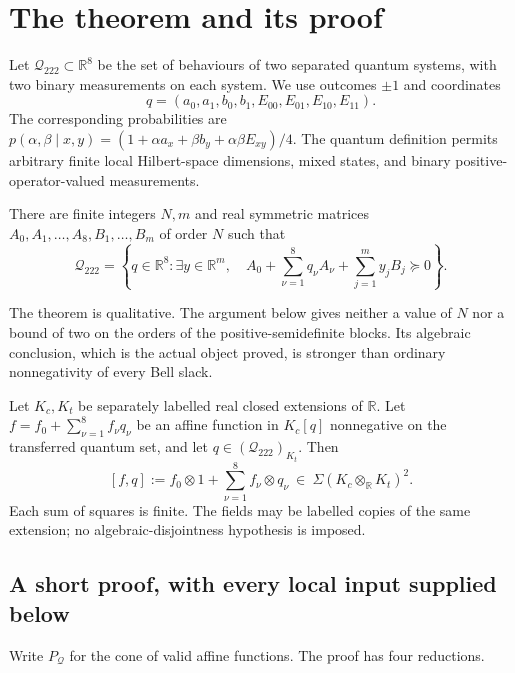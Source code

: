 \chapter{The theorem and its proof}
\label{ch:theorem}

Let $\mathcal Q_{222}\subset\mathbb R^8$ be the set of behaviours of
two separated quantum systems, with two binary measurements on each
system.  We use outcomes $\pm1$ and coordinates
\[
 q=(a_0,a_1,b_0,b_1,E_{00},E_{01},E_{10},E_{11}).
\]
The corresponding probabilities are
$p(\alpha,\beta\mid x,y)=
(1+\alpha a_x+\beta b_y+\alpha\beta E_{xy})/4$.
The quantum definition permits arbitrary finite local Hilbert-space
dimensions, mixed states, and binary positive-operator-valued measurements.

\begin{theorem}
\label{thm:main}
There are finite integers $N,m$ and real symmetric matrices
$A_0,A_1,\ldots,A_8,B_1,\ldots,B_m$ of order $N$ such that
\[
 \mathcal Q_{222}
 =\left\{q\in\mathbb R^8:
     \exists y\in\mathbb R^m,\quad
     A_0+\sum_{\nu=1}^{8}q_\nu A_\nu+
                 \sum_{j=1}^{m}y_jB_j\succeq0\right\}.
\]
\end{theorem}

The theorem is qualitative.  The argument below gives neither a value of
$N$ nor a bound of two on the orders of the positive-semidefinite blocks.
Its algebraic conclusion, which is the actual object proved, is stronger
than ordinary nonnegativity of every Bell slack.

\begin{theorem}
\label{thm:slack}
Let $K_c,K_t$ be separately labelled real closed extensions of
$\mathbb R$.  Let $f=f_0+\sum_{\nu=1}^{8} f_\nu q_\nu$ be an
affine function in $K_c[q]$ nonnegative on the transferred quantum set,
and let $q\in(\mathcal Q_{222})_{K_t}$.  Then
\[
 [f,q]:=f_0\otimes1+\sum_{\nu=1}^{8}f_\nu\otimes q_\nu
       \ \in\ \Sigma(K_c\otimes_{\mathbb R}K_t)^2.
\]
Each sum of squares is finite.  The fields may be labelled copies of
the same extension; no algebraic-disjointness hypothesis is imposed.
\end{theorem}

\section{A short proof, with every local input supplied below}

Write $P_{\mathcal Q}$ for the cone of valid affine functions.
The proof has four reductions.


